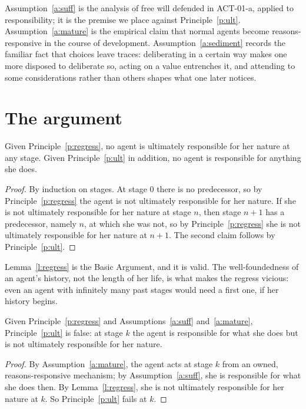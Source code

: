 \documentclass{situationist-preprint}
\begin{document}
Assumption~\ref{a:suff} is the analysis of free will defended in ACT-01-a, applied to responsibility; it is the premise we place against Principle~\ref{p:ult}. Assumption~\ref{a:mature} is the empirical claim that normal agents become reasons-responsive in the course of development. Assumption~\ref{a:sediment} records the familiar fact that choices leave traces: deliberating in a certain way makes one more disposed to deliberate so, acting on a value entrenches it, and attending to some considerations rather than others shapes what one later notices.

\section{The argument}\label{s:arg}

\begin{lemma}\label{l:regress}
Given Principle~\ref{p:regress}, no agent is ultimately responsible for her nature at any stage. Given Principle~\ref{p:ult} in addition, no agent is responsible for anything she does.
\end{lemma}

\begin{proof}
By induction on stages. At stage $0$ there is no predecessor, so by Principle~\ref{p:regress} the agent is not ultimately responsible for her nature. If she is not ultimately responsible for her nature at stage $n$, then stage $n+1$ has a predecessor, namely $n$, at which she was not, so by Principle~\ref{p:regress} she is not ultimately responsible for her nature at $n+1$. The second claim follows by Principle~\ref{p:ult}.
\end{proof}

Lemma~\ref{l:regress} is the Basic Argument, and it is valid. The well-foundedness of an agent's history, not the length of her life, is what makes the regress vicious: even an agent with infinitely many past stages would need a first one, if her history begins.

\begin{theorem}\label{t:fails}
Given Principle~\ref{p:regress} and Assumptions~\ref{a:suff} and~\ref{a:mature}, Principle~\ref{p:ult} is false: at stage $k$ the agent is responsible for what she does but is not ultimately responsible for her nature.
\end{theorem}

\begin{proof}
By Assumption~\ref{a:mature}, the agent acts at stage $k$ from an owned, reasons-responsive mechanism; by Assumption~\ref{a:suff}, she is responsible for what she does then. By Lemma~\ref{l:regress}, she is not ultimately responsible for her nature at $k$. So Principle~\ref{p:ult} fails at $k$.
\end{proof}
\end{document}
